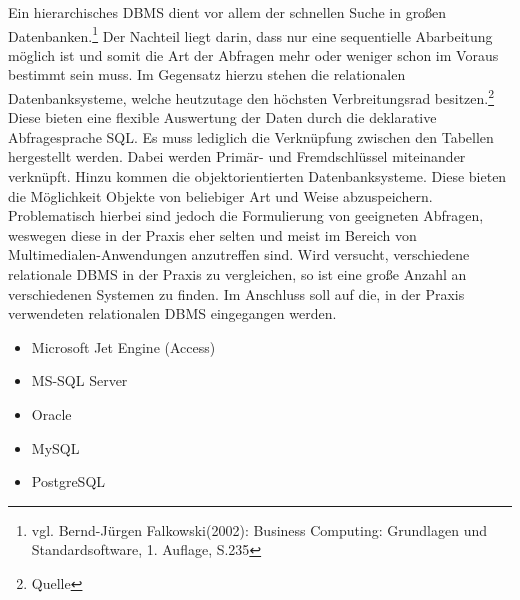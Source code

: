 Ein hierarchisches DBMS dient vor allem der schnellen Suche in großen Datenbanken.\footnote{vgl. Bernd-Jürgen Falkowski(2002): Business Computing: Grundlagen und Standardsoftware, 1. Auflage, S.235}
Der Nachteil liegt darin, dass nur eine sequentielle Abarbeitung möglich ist und somit die Art der Abfragen mehr oder weniger schon im Voraus bestimmt sein muss.
Im Gegensatz hierzu stehen die relationalen Datenbanksysteme, welche heutzutage den höchsten Verbreitungsrad besitzen.\footnote{Quelle}
Diese bieten eine flexible Auswertung der Daten durch die deklarative Abfragesprache SQL.
Es muss lediglich die Verknüpfung zwischen den Tabellen hergestellt werden. Dabei werden Primär- und Fremdschlüssel miteinander verknüpft.
Hinzu kommen die objektorientierten Datenbanksysteme. Diese bieten die Möglichkeit Objekte von beliebiger Art und Weise abzuspeichern.
Problematisch hierbei sind jedoch die Formulierung von geeigneten Abfragen, weswegen diese in der Praxis eher selten und meist im Bereich von Multimedialen-Anwendungen anzutreffen sind.%
Wird versucht, verschiedene relationale DBMS in der Praxis zu vergleichen, so ist eine große Anzahl an verschiedenen Systemen zu finden.
Im Anschluss soll auf die, in der Praxis verwendeten relationalen DBMS eingegangen werden.

\begin{itemize}
\item Microsoft Jet Engine (Access)
\item MS-SQL Server
\item Oracle
\item MySQL
\item PostgreSQL
\end{itemize}

